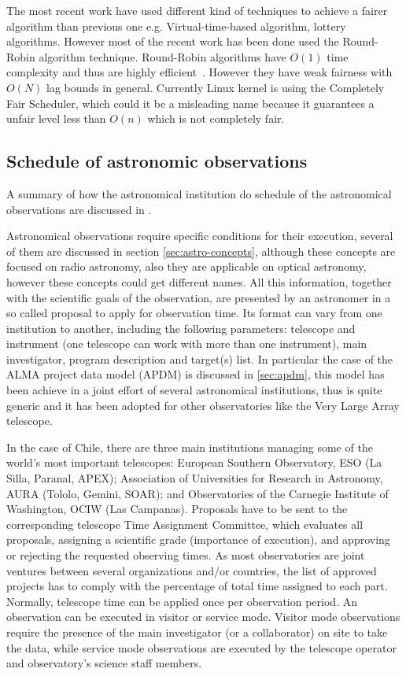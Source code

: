 \documentclass[11pt]{article}
\begin{document}
The most recent work have used different kind of techniques to achieve a fairer algorithm than previous one e.g. Virtual-time-based algorithm, lottery algorithms. However most of the recent work has been done used the Round-Robin algorithm technique. Round-Robin algorithms have $O(1)$ time complexity and thus are highly efficient~\cite{li09}. However they have weak fairness with $O(N)$ lag bounds in general. Currently Linux kernel is using the Completely Fair Scheduler, which could it be a misleading name because it guarantees a unfair level less than $O(n)$ which is not completely fair. 

\subsection{Schedule of astronomic observations}

A summary of how the astronomical institution do schedule of the astronomical observations are discussed in \cite{mora11}.

Astronomical observations require specific conditions for their execution, several of them are discussed in section \ref{sec:astro-concepts}, although these concepts are focused on radio astronomy, also they are applicable on optical astronomy, however these concepts could get different names. All this information, together with the scientific goals of the observation, are presented by an astronomer in a so called proposal to apply for observation time. Its format can vary from one institution to another, including the following parameters: telescope and instrument (one telescope can work with more than one instrument), main investigator, program description and target(s) list. In particular the case of the ALMA project data model (APDM) is discussed in \ref{sec:apdm}, this model has been achieve in a joint effort of several astronomical institutions, thus is quite generic and it has been adopted for other observatories like the Very Large Array telescope.

In the case of Chile, there are three main institutions managing some of the world’s most important telescopes: European Southern Observatory, ESO (La Silla, Paranal, APEX); Association of Universities for Research in Astronomy, AURA (Tololo, Gemini, SOAR); and Observatories of the Carnegie Institute of Washington, OCIW (Las Campanas). Proposals have to be sent to the corresponding telescope Time Assignment Committee, which evaluates all proposals, assigning a scientific grade (importance of execution), and approving or rejecting the requested observing times. As most observatories are joint ventures between several organizations and/or countries, the list of approved projects has to comply with the percentage of total time assigned to each part. Normally, telescope time can be applied once per observation period. An observation can be executed in visitor or service mode. Visitor mode observations require the presence of the main investigator (or a collaborator) on site to take the data, while service mode observations are executed by the telescope operator and observatory’s science staff members.
\end{document}
